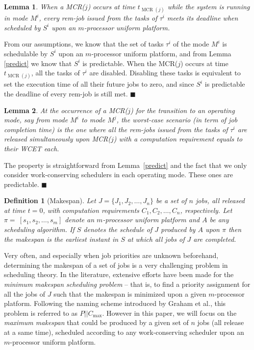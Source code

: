 \documentclass[10pt,english,a4paper]{article}
\newtheorem{lemma}{Lemma}
\newtheorem{definition}{\bf Definition}
\newenvironment{proof}[1][Proof]{\begin{trivlist}
\item[\hskip \labelsep {\bfseries #1}]}{\end{trivlist}}
\newtheorem{validity test}{Validity Test}
\newcommand{\fin}{\hfill{\small $\blacksquare$}}     \newcommand{\oh}[1]{\ensuremath{\mathcal{0}{(#1)}}} \def\thefootnote{\arabic{footnote}}
\begin{document}
\begin{lemma}\label{rem-deadlines}
When a MCR($j$) occurs at time $t_{\operatorname{MCR}(j)}$ while the system is running in mode $M^i$, every rem-job issued from the tasks of $\tau^i$ meets its deadline when scheduled by $S^i$ upon an $m$-processor uniform platform.
\end{lemma}
\begin{proof}
From our assumptions, we know that the set of tasks $\tau^i$ of the mode $M^i$ is schedulable by $S^i$ upon an $m$-processor uniform platform, and from Lemma \ref{predict} we know that $S^i$ is predictable. When the MCR($j$) occurs at time $t_{\operatorname{MCR}(j)}$, all the tasks of $\tau^i$ are disabled. Disabling these tasks is equivalent to set the execution time of all their future jobs to zero, and since $S^i$ is predictable the deadline of every rem-job is still met. \fin
\end{proof}

\begin{lemma}\label{worst-case scenario}
At the occurrence of a MCR($j$) for the transition to an operating mode, say from mode $M^i$ to mode $M^j$, the {\em worst-case scenario} (in term of job completion time) is the one where all the rem-jobs issued from the tasks of $\tau^i$ are released simultaneously upon MCR($j$) with a computation requirement equals to their WCET each. 
\end{lemma}

\begin{proof}
The property is straightforward from Lemma~\ref{predict} and the fact that we only consider work-conserving schedulers in each operating mode. These ones are predictable. \fin
\end{proof}

\begin{definition}[Makespan]
Let $J = \{J_1, J_2, \ldots, J_n\}$ be a set of $n$ jobs, all released at time $t = 0$, with computation requirements $C_1, C_2, \ldots, C_n$, respectively. Let $\pi=~[s_1, s_2, \ldots, s_m]$ denote an $m$-processor uniform platform and $A$ be any scheduling algorithm. If $S$ denotes the schedule of $J$ produced by $A$ upon $\pi$ then the {\em makespan} is the earliest instant in $S$ at which all jobs of $J$ are completed.
\end{definition}

Very often, and especially when job priorities are unknown beforehand, determining the makespan of a set of jobs is a very challenging problem in scheduling theory. In the literature, extensive efforts have been made for the {\em minimum makespan scheduling problem} -- that is, to find a priority assignment for all the jobs of $J$ such that the makespan is minimized upon a given $m$-processor platform. Following the naming scheme introduced by Graham et al.\cite{GLLR1}, this problem is referred to as $P | | C_{\mbox{max}}$. However in this paper, we will focus on the {\em maximum makespan} that could be produced by a given set of $n$ jobs (all release at a same time), scheduled according to any work-conserving scheduler upon an $m$-processor uniform platform. 
\end{document}
